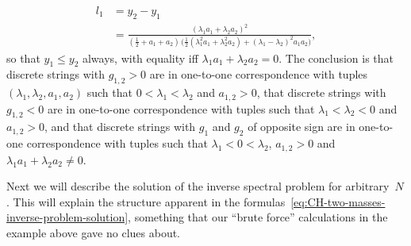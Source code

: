 \documentclass[10pt,a4paper]{article} \pdfoutput=1 
\begin{document}
\begin{example}
\begin{equation}
\begin{split}
      l_1 &
      = y_2 - y_1
      \\ &
      = \frac{(\lambda_1 a_1 + \lambda_2 a_2)^2}{(\tfrac12 + a_1 + a_2) \, \bigl( \tfrac12 (\lambda_1^2 a_1 + \lambda_2^2 a_2) + (\lambda_1-\lambda_2)^2 a_1 a_2 \bigr)}
      ,
    \end{split}
  \end{equation}
  so that $y_1 \le y_2$ always, with equality iff $\lambda_1 a_1 + \lambda_2 a_2 = 0$.
  The conclusion is that discrete strings with $g_{1,2} > 0$ are in one-to-one correspondence with
  tuples $(\lambda_1,\lambda_2,a_1,a_2)$ such that $0 < \lambda_1 < \lambda_2$ and $a_{1,2}>0$,
  that discrete strings with $g_{1,2}< 0$ are in one-to-one correspondence with
  tuples such that $\lambda_1 < \lambda_2 < 0$ and $a_{1,2}>0$,
  and that discrete strings with $g_1$ and $g_2$ of opposite sign are in one-to-one correspondence with
  tuples such that $\lambda_1 < 0 < \lambda_2$, $a_{1,2}>0$ and $\lambda_1 a_1 + \lambda_2 a_2 \ne 0$.
\end{example}

Next we will describe the solution of the inverse spectral problem for arbitrary~$N$.
This will explain the structure apparent in the
formulas~\eqref{eq:CH-two-masses-inverse-problem-solution},
something that our ``brute force'' calculations in the example above
gave no clues about.
\end{document}
